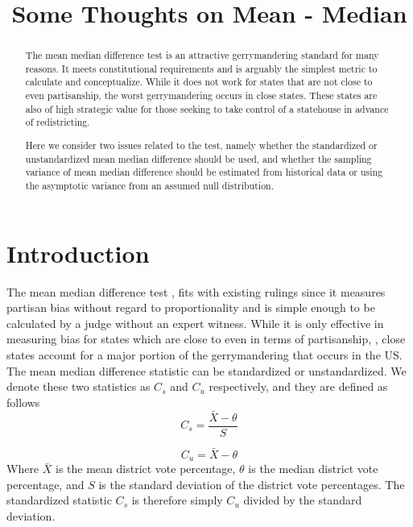 \documentclass[preprint,12pt]{article}
\begin{document}
\title{Some Thoughts on Mean - Median}


\maketitle

\begin{abstract}
The mean median difference test is an attractive gerrymandering standard for many reasons.
It meets constitutional requirements and is arguably the simplest metric to calculate and conceptualize.
While it does not work for states that are not close to even partisanship, the worst gerrymandering occurs in close states.
These states are also of high strategic value for those seeking to take control of a statehouse in advance of redistricting.

Here we consider two issues related to the test, namely whether the standardized or unstandardized mean median difference should be used, and whether the sampling variance of mean median difference should be estimated from historical data or using the asymptotic variance from an assumed null distribution.

\end{abstract}

\section{Introduction}
The mean median difference test \cite{Wang__,Wang_2016_10.1089/elj.2016.0387,McDonald_2015_10.1089/elj.2015.0358}, fits with existing rulings since it measures partisan bias without regard to proportionality and is simple enough to be calculated by a judge without an expert witness.
While it is only effective in measuring bias for states which are close to even in terms of partisanship, \cite{Wang_2016_10.1089/elj.2016.0387}, close states account for a major portion of the gerrymandering that occurs in the US.
The mean median difference statistic can be standardized or unstandardized. 
We denote these two statistics as $C_{s}$ and $C_{u}$ respectively, and they are defined as follows
\begin{equation}
    C_{s} = \frac{\bar{X}-\theta}{S}
\end{equation}

\begin{equation}
    C_{u} = \bar{X}-\theta
\end{equation}
Where $\bar{X}$ is the mean district vote percentage, $\theta$ is the median district vote percentage, and $S$ is the standard deviation of the district vote percentages.
The standardized statistic $C_{s}$ is therefore simply $C_{u}$ divided by the standard deviation.
\end{document}
